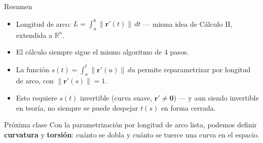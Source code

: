 \documentclass[11pt,aspectratio=169]{beamer}
\begin{document}
\begin{frame}{Resumen}
  \begin{itemize}
    \item Longitud de arco: $\displaystyle L=\int_a^b\|\mathbf r'(t)\|\,dt$ --- misma idea de Cálculo II, extendida a $\mathbb R^n$.
    \item El cálculo siempre sigue el mismo algoritmo de 4 pasos.
    \item La función $s(t)=\int_a^t\|\mathbf r'(u)\|\,du$ permite reparametrizar por longitud de arco, con $\|\mathbf r'(s)\|=1$.
    \item Esto requiere $s(t)$ invertible (curva suave, $\mathbf r'\neq\mathbf 0$) --- y aun siendo invertible en teoría, no siempre se puede despejar $t(s)$ en forma cerrada.
  \end{itemize}
  \vspace{10pt}
  \pause
  \begin{block}{Próxima clase}
    Con la parametrización por longitud de arco lista, podemos definir \textbf{curvatura} y \textbf{torsión}: cuánto se dobla y cuánto se tuerce una curva en el espacio.
  \end{block}
\end{frame}
\end{document}
